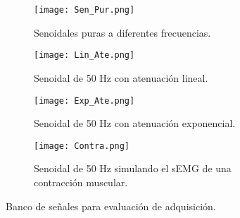 \begin{figure}[htbp]
	\centering
	\begin{subfigure}[htbp]{0.45\textwidth}
		\texttt{[image: Sen\_Pur.png]}
		\caption{Senoidales puras a diferentes frecuencias.}
		\label{Figura: SenPur}
	\end{subfigure}
	\hfill
	\begin{subfigure}[htbp]{0.45\textwidth}
		\texttt{[image: Lin\_Ate.png]}
		\caption{Senoidal de 50 Hz con atenuación lineal.}
		\label{Figura: LinAte}
	\end{subfigure}
	\hfill
	\begin{subfigure}[htbp]{0.45\textwidth}
		\texttt{[image: Exp\_Ate.png]}
		\caption{Senoidal de 50 Hz con atenuación exponencial.}
		\label{Figura: ExpAte}
	\end{subfigure}
	\hfill
	\begin{subfigure}[htbp]{0.45\textwidth}
		\texttt{[image: Contra.png]}
		\caption{Senoidal de 50 Hz simulando el sEMG de una contracción muscular.}
		\label{Figura: Contra}
	\end{subfigure}	
	\caption{Banco de señales para evaluación de adquisición.}
	\label{Figura: SenalesEva}
\end{figure}

